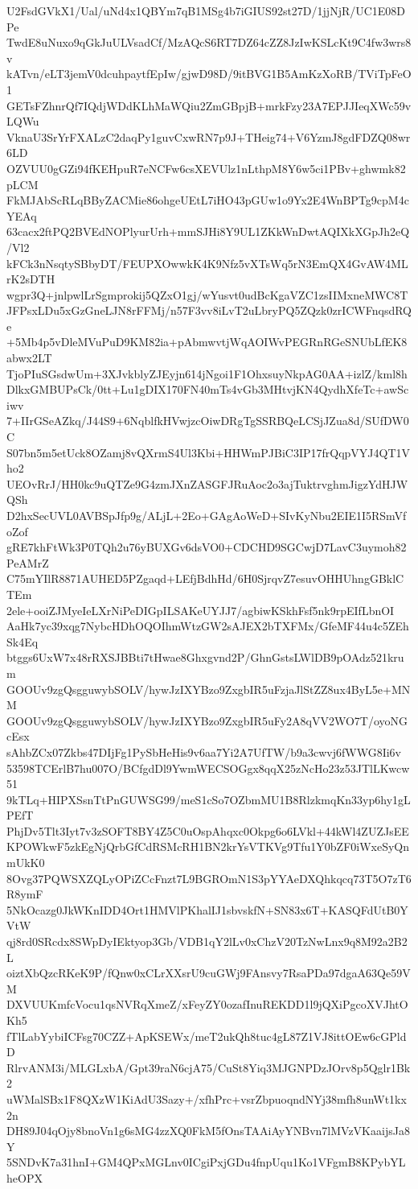U2FsdGVkX1/Ual/uNd4x1QBYm7qB1MSg4b7iGIUS92st27D/1jjNjR/UC1E08DPe
TwdE8uNuxo9qGkJuULVsadCf/MzAQcS6RT7DZ64cZZ8JzIwKSLcKt9C4fw3wrs8v
kATvn/eLT3jemV0dcuhpaytfEpIw/gjwD98D/9itBVG1B5AmKzXoRB/TViTpFeO1
GETsFZhnrQf7IQdjWDdKLhMaWQiu2ZmGBpjB+mrkFzy23A7EPJJIeqXWc59vLQWu
VknaU3SrYrFXALzC2daqPy1guvCxwRN7p9J+THeig74+V6YzmJ8gdFDZQ08wr6LD
OZVUU0gGZi94fKEHpuR7eNCFw6csXEVUlz1nLthpM8Y6w5ci1PBv+ghwmk82pLCM
FkMJAbScRLqBByZACMie86ohgeUEtL7iHO43pGUw1o9Yx2E4WnBPTg9cpM4cYEAq
63cacx2ftPQ2BVEdNOPlyurUrh+mmSJHi8Y9UL1ZKkWnDwtAQIXkXGpJh2eQ/Vl2
kFCk3nNsqtySBbyDT/FEUPXOwwkK4K9Nfz5vXTsWq5rN3EmQX4GvAW4MLrK2sDTH
wgpr3Q+jnlpwlLrSgmprokij5QZxO1gj/wYusvt0udBcKgaVZC1zsIIMxneMWC8T
JFPsxLDu5xGzGneLJN8rFFMj/n57F3vv8iLvT2uLbryPQ5ZQzk0zrICWFnqsdRQe
+5Mb4p5vDleMVuPuD9KM82ia+pAbmwvtjWqAOIWvPEGRnRGeSNUbLfEK8abwx2LT
TjoPIuSGsdwUm+3XJvkblyZJEyjn614jNgoi1F1OhxsuyNkpAG0AA+izlZ/kml8h
DlkxGMBUPsCk/0tt+Lu1gDIX170FN40mTs4vGb3MHtvjKN4QydhXfeTc+awSciwv
7+IIrGSeAZkq/J44S9+6NqblfkHVwjzcOiwDRgTgSSRBQeLCSjJZua8d/SUfDW0C
S07bn5m5etUck8OZamj8vQXrmS4Ul3Kbi+HHWmPJBiC3IP17frQqpVYJ4QT1Vho2
UEOvRrJ/HH0kc9uQTZe9G4zmJXnZASGFJRuAoc2o3ajTuktrvghmJigzYdHJWQSh
D2hxSecUVL0AVBSpJfp9g/ALjL+2Eo+GAgAoWeD+SIvKyNbu2EIE1I5RSmVfoZof
gRE7khFtWk3P0TQh2u76yBUXGv6dsVO0+CDCHD9SGCwjD7LavC3uymoh82PeAMrZ
C75mYIlR8871AUHED5PZgaqd+LEfjBdhHd/6H0SjrqvZ7esuvOHHUhngGBklCTEm
2ele+ooiZJMyeIeLXrNiPeDIGpILSAKeUYJJ7/agbiwKSkhFsf5nk9rpEIfLbnOI
AaHk7yc39xqg7NybcHDhOQOIhmWtzGW2sAJEX2bTXFMx/GfeMF44u4c5ZEhSk4Eq
btggs6UxW7x48rRXSJBBti7tHwae8Ghxgvnd2P/GhnGstsLWlDB9pOAdz521krum
GOOUv9zgQsgguwybSOLV/hywJzIXYBzo9ZxgbIR5uFzjaJlStZZ8ux4ByL5e+MNM
GOOUv9zgQsgguwybSOLV/hywJzIXYBzo9ZxgbIR5uFy2A8qVV2WO7T/oyoNGcEsx
sAhbZCx07Zkbs47DIjFg1PySbHeHis9v6aa7Yi2A7UfTW/b9a3cwvj6fWWG8Ii6v
53598TCErlB7hu007O/BCfgdDl9YwmWECSOGgx8qqX25zNcHo23z53JTlLKwcw51
9kTLq+HIPXSsnTtPnGUWSG99/meS1cSo7OZbmMU1B8RlzkmqKn33yp6hy1gLPEfT
PhjDv5Tlt3Iyt7v3zSOFT8BY4Z5C0uOspAhqxc0Okpg6o6LVkl+44kWl4ZUZJsEE
KPOWkwF5zkEgNjQrbGfCdRSMcRH1BN2krYsVTKVg9Tfu1Y0bZF0iWxeSyQnmUkK0
8Ovg37PQWSXZQLyOPiZCcFnzt7L9BGROmN1S3pYYAeDXQhkqcq73T5O7zT6R8ymF
5NkOcazg0JkWKnIDD4Ort1HMVlPKhalIJ1sbvskfN+SN83x6T+KASQFdUtB0YVtW
qj8rd0SRcdx8SWpDyIEktyop3Gb/VDB1qY2lLv0xChzV20TzNwLnx9q8M92a2B2L
oiztXbQzcRKeK9P/fQnw0xCLrXXsrU9cuGWj9FAnsvy7RsaPDa97dgaA63Qe59VM
DXVUUKmfcVocu1qsNVRqXmeZ/xFeyZY0ozafInuREKDD1l9jQXiPgcoXVJhtOKh5
fTlLabYybiICFsg70CZZ+ApKSEWx/meT2ukQh8tuc4gL87Z1VJ8ittOEw6cGPldD
RlrvANM3i/MLGLxbA/Gpt39raN6cjA75/CuSt8Yiq3MJGNPDzJOrv8p5Qglr1Bk2
uWMalSBx1F8QXzW1KiAdU3Sazy+/xfhPrc+vsrZbpuoqndNYj38mfh8unWt1kx2n
DH89J04qOjy8bnoVn1g6sMG4zzXQ0FkM5fOnsTAAiAyYNBvn7lMVzVKaaijsJa8Y
5SNDvK7a31hnI+GM4QPxMGLnv0ICgiPxjGDu4fnpUqu1Ko1VFgmB8KPybYLheOPX
